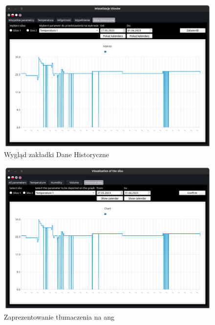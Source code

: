     \begin{figure}[H]
        \centering
        \includegraphics[width = \textwidth]{obrazy/hist_data_tab.png}
        \caption{Wygląd zakładki Dane Historyczne}
        \label{fig: hist data tab}
    \end{figure}


    \begin{figure}[H]
        \centering
        \includegraphics[width = \textwidth]{obrazy/ang.png}
        \caption{Zaprezentowanie tłumaczenia na ang}
        \label{fig: ang}
    \end{figure}

